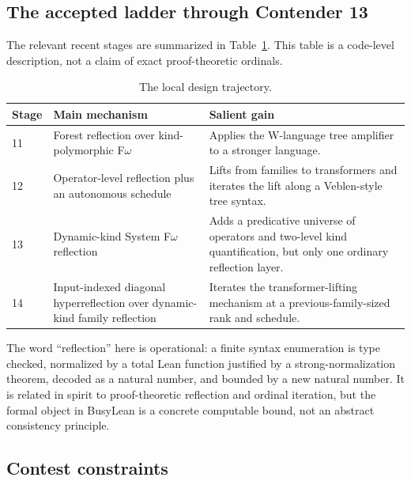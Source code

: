 \documentclass[11pt]{article}
\theoremstyle{definition}
\begin{document}
\subsection{The accepted ladder through Contender 13}

The relevant recent stages are summarized in Table~\ref{tab:baseline}.  This table is a code-level description, not a claim of exact proof-theoretic ordinals.

\begin{table}[ht]
\centering
\small
\begin{tabular}{@{}p{}p{}p{}@{}}
\toprule
Stage & Main mechanism & Salient gain \\
\midrule
11 & Forest reflection over kind-polymorphic F$\omega$ & Applies the W-language tree amplifier to a stronger language. \\
12 & Operator-level reflection plus an autonomous schedule & Lifts from families to transformers and iterates the lift along a Veblen-style tree syntax. \\
13 & Dynamic-kind System F$\omega$ reflection & Adds a predicative universe of operators and two-level kind quantification, but only one ordinary reflection layer. \\
14 & Input-indexed diagonal hyperreflection over dynamic-kind family reflection & Iterates the transformer-lifting mechanism at a previous-family-sized rank and schedule. \\
\bottomrule
\end{tabular}
\caption{The local design trajectory.}
\label{tab:baseline}
\end{table}

The word ``reflection'' here is operational: a finite syntax enumeration is type checked, normalized by a total Lean function justified by a strong-normalization theorem, decoded as a natural number, and bounded by a new natural number.  It is related in spirit to proof-theoretic reflection and ordinal iteration, but the formal object in BusyLean is a concrete computable bound, not an abstract consistency principle.

\subsection{Contest constraints}
\end{document}
